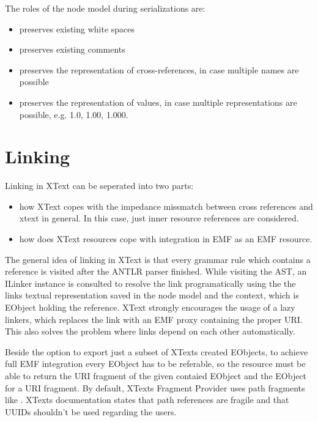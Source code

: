 The roles of the node model during serializations are:
\begin{itemize}
	\item preserves existing white spaces
	\item preserves existing comments
	\item preserves the representation of cross-references, in case multiple names are possible
	\item preserves the representation of values, in case multiple representations are possible, e.g. 1.0, 1.00, 1.000.
\end{itemize}

\section{Linking}
\label{sec:xtextarch:Linking}
Linking in XText can be seperated into two parts:
\begin{itemize}
	\item how XText copes with the impedance missmatch between cross references and xtext in general. In this case, just inner resource references are considered. 
	\item how does XText resources cope with integration in EMF as an EMF resource.
\end{itemize}
The general idea of linking in XText is that every grammar rule which contains a reference is visited after the ANTLR parser finished. While visiting the AST, an ILinker instance is consulted to resolve the link programatically using the the links textual representation saved in the node model and the context, which is EObject holding the reference. XText strongly encourages the usage of a lazy linkers, which replaces the link with an EMF proxy containing the proper URI. This also solves the problem where links depend on each other automatically.

Beside the option to export just a subset of XTexts created EObjects, to achieve full EMF integration every EObject has to be referable, so the resource must be able to return the URI fragment of the given contaied EObject and the EObject for a URI fragment. By default, XTexts Fragment Provider  uses path fragments like . XTexts documentation states that path references are fragile and that UUIDs shouldn't be used regarding the users. 

